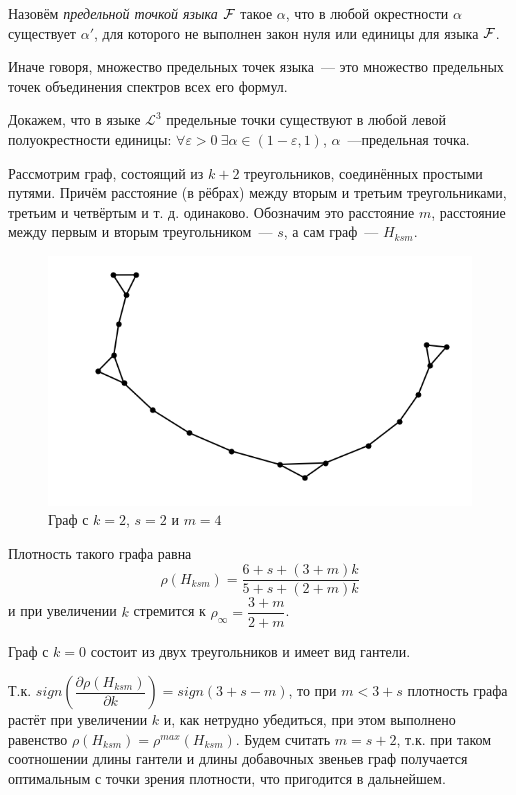 \Def Назовём \textit{предельной точкой языка $\mathcal{F}$} такое $\alpha$, что в любой окрестности $\alpha$ существует $\alpha'$, для которого не выполнен закон нуля или единицы для языка $\mathcal{F}$.

Иначе говоря, множество предельных точек языка~--- это множество предельных точек объединения спектров всех его формул.

Докажем, что в языке $\mathcal{L}^3$ предельные точки существуют в любой левой полуокрестности единицы: 
$\forall \varepsilon > 0 ~ \exists \alpha \in (1 - \varepsilon, 1)$, $\alpha$~---предельная точка.

Рассмотрим граф, состоящий из $k+2$ треугольников, соединённых простыми путями.
Причём расстояние (в рёбрах) между вторым и третьим треугольниками, третьим и четвёртым и т. д. одинаково.
Обозначим это расстояние $m$, расстояние между первым и вторым треугольником~--- $s$, а сам граф~--- $H_{ksm}$.

\begin{figure}[h]
    \centering
  \includegraphics[scale=0.4]{picrel/Hksm.png}
  \caption{Граф с $k = 2$, $s = 2$ и $m = 4$}
  \label{fig:chain1}
\end{figure}

Плотность такого графа равна 
$$\rho({H_{ksm}}) = \dfrac{6+s + (3+m)k}{5+s + (2+m)k}$$
и при увеличении $k$ стремится к $\rho_\infty = \dfrac{3+m}{2+m}$.

Граф с $k=0$ состоит из двух треугольников и имеет вид гантели.

Т.к. 
$sign\left(\dfrac{\partial\rho({H_{ksm}})}{\partial k}\right) = sign(3+s-m)$,
то при $m < 3 + s$ плотность графа растёт при увеличении  $k$ и, как нетрудно убедиться, при этом выполнено равенство
$\rho({H_{ksm}}) = \rho^{max}({H_{ksm}})$.
Будем считать $m = s+2$, т.к. при таком соотношении длины гантели и длины добавочных звеньев
граф получается оптимальным с точки зрения плотности, что пригодится в дальнейшем.

